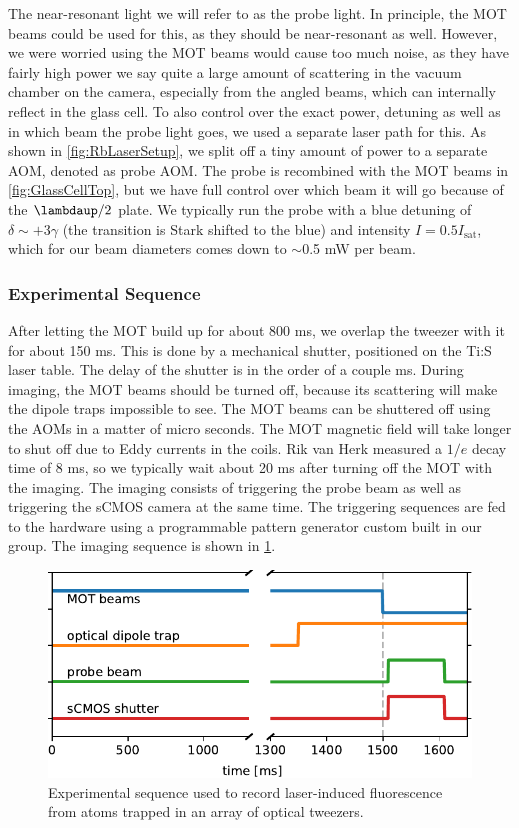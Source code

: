 The near-resonant light we will refer to as the probe light. 
In principle, the MOT beams could be used for this, as they should be near-resonant as well. 
However, we were worried using the MOT beams would cause too much noise, as they have fairly high power we say quite a large amount of scattering in the vacuum chamber on the camera, especially from the angled beams, which can internally reflect in the glass cell.
To also control over the exact power, detuning as well as in which beam the probe light goes, we used a separate laser path for this. 
As shown in \cref{fig:RbLaserSetup}, we split off a tiny amount of power to a separate AOM, denoted as probe AOM. 
The probe is recombined with the MOT beams in \cref{fig:GlassCellTop}, but we have full control over which beam it will go because of the $\lambdaup/2$ plate.
We typically run the probe with a blue detuning of $\delta \sim +3\gamma$ (the transition is Stark shifted to the blue) and intensity $I = 0.5 I_{\text{sat}}$, which for our beam diameters comes down to $\sim0.$5 mW per beam. 

\subsubsection*{Experimental Sequence}

After letting the MOT build up for about 800 ms, we overlap the tweezer with it for about 150 ms.
This is done by a mechanical shutter, positioned on the \ac{Ti:S} laser table.
The delay of the shutter is in the order of a couple ms. 
During imaging, the MOT beams should be turned off, because its scattering will make the dipole traps impossible to see. 
The MOT beams can be shuttered off using the \ac{AOM}s in a matter of micro seconds. 
The MOT magnetic field will take longer to shut off due to Eddy currents in the coils. 
Rik van Herk measured a $1/e$ decay time of 8 ms, so we typically wait about 20 ms after turning off the MOT with the imaging. 
The imaging consists of triggering the probe beam as well as triggering the sCMOS camera at the same time. 
The triggering sequences are fed to the hardware using a programmable pattern generator custom built in our group. 
The imaging sequence is shown in \cref{fig:Sequence}.

\begin{figure}
    \centering
    \includegraphics{figures/Sequence.pdf}
    \caption{Experimental sequence used to record laser-induced fluorescence from atoms trapped in an array of optical tweezers. }
    \label{fig:Sequence}
\end{figure}

